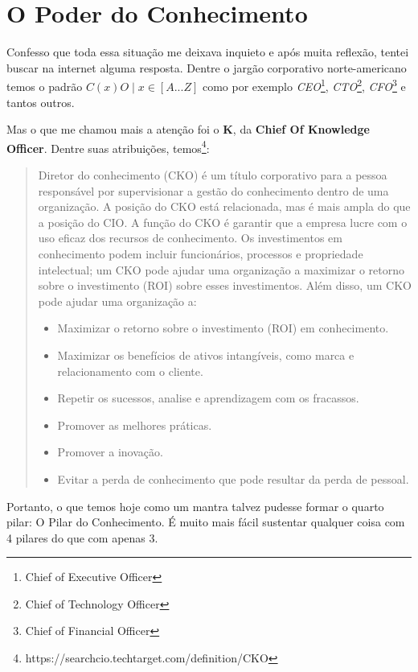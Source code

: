 \section{O Poder do Conhecimento}

Confesso que toda essa situação me deixava inquieto e após muita reflexão, tentei buscar na internet alguma resposta. Dentre o jargão corporativo norte-americano temos o padrão $C(x)O \; | \; x \in [A...Z]$ como por exemplo \emph{CEO}\footnote{Chief of Executive Officer}, \emph{CTO}\footnote{Chief of Technology Officer}, \emph{CFO}\footnote{Chief of Financial Officer} e tantos outros. 

Mas o que me chamou mais a atenção foi o \textbf{K}, da \textbf{Chief Of Knowledge Officer}. Dentre suas atribuições, temos\footnote{https://searchcio.techtarget.com/definition/CKO}:

\begin{quotation}
    Diretor do conhecimento (CKO) é um título corporativo para a pessoa responsável por supervisionar a gestão do conhecimento dentro de uma organização. A posição do CKO está relacionada, mas é mais ampla do que a posição do CIO. A função do CKO é garantir que a empresa lucre com o uso eficaz dos recursos de conhecimento. Os investimentos em conhecimento podem incluir funcionários, processos e propriedade intelectual; um CKO pode ajudar uma organização a maximizar o retorno sobre o investimento (ROI) sobre esses investimentos.
    Além disso, um CKO pode ajudar uma organização a:
    \begin{itemize}
        \item Maximizar o retorno sobre o investimento (ROI) em conhecimento.
        \item Maximizar os benefícios de ativos intangíveis, como marca e relacionamento com o cliente.
        \item Repetir os sucessos, analise e aprendizagem com os fracassos.
        \item Promover as melhores práticas.
        \item Promover a inovação.
        \item Evitar a perda de conhecimento que pode resultar da perda de pessoal.
    \end{itemize}
\end{quotation}

Portanto, o que temos hoje como um mantra talvez pudesse formar o quarto pilar: O Pilar do Conhecimento. É muito mais fácil sustentar qualquer coisa com 4 pilares do que com apenas 3.

